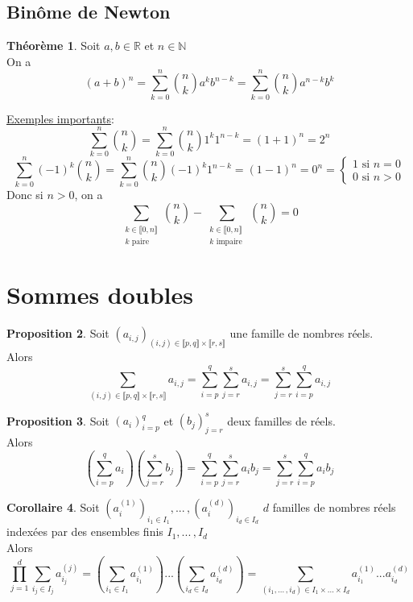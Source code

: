 \documentclass[10pt,a4paper]{article}
\theoremstyle{definition}
\newtheorem{proposition}{Proposition}[section]
\newtheorem{theorem}[proposition]{Théorème}
\newtheorem{corollaire}[proposition]{Corollaire}
\begin{document}
\subsection{Binôme de Newton}
\begin{theorem}
Soit $a, b \in \mathbb{R}$ et $n \in \mathbb{N}$ \\
On a
\[ (a + b)^n = \sum_{k = 0}^n \binom{n}{k} a^k b^{n - k} = \sum_{k = 0}^n \binom{n}{k} a^{n - k} b^k \]
\end{theorem}
\noindent \uline{Exemples importants}:
\[ \sum_{k = 0}^n \binom{n}{k} = \sum_{k = 0}^n \binom{n}{k} 1^k 1^{n - k} = (1 + 1)^n = 2^n \]
\[ \sum_{k = 0}^n (-1)^k \binom{n}{k} = \sum_{k = 0}^n \binom{n}{k} (-1)^k 1^{n - k} = (1 - 1)^n = 0^n = \begin{cases}
1 \text{ si } n = 0 \\
0 \text{ si } n > 0
\end{cases} \]
Donc si $n > 0$, on a
\[ \sum_{\substack{k \in \llbracket 0, n \rrbracket \\ k \text{ paire }}} \binom{n}{k} - \sum_{\substack{k \in \llbracket 0, n \rrbracket \\ k \text{ impaire }}} \binom{n}{k} = 0 \]

\section{Sommes doubles}
\begin{proposition}
Soit $(a_{i, j})_{(i, j) \in \llbracket p, q \rrbracket \times \llbracket r, s \rrbracket}$ une famille de nombres réels. \\
Alors
\[ \sum_{(i, j) \in \llbracket p, q \rrbracket \times \llbracket r, s \rrbracket} a_{i, j} = \sum_{i = p}^q \sum_{j = r}^s a_{i, j} = \sum_{j = r}^s \sum_{i = p}^q a_{i, j} \]
\end{proposition}
\begin{proposition}
Soit $(a_i)_{i = p}^q$ et $(b_j)_{j = r}^s$ deux familles de réels. \\
Alors
\[ \left(\sum_{i = p}^q a_i\right) \left(\sum_{j = r}^s b_j\right) = \sum_{i = p}^q \sum_{j = r}^s a_i b_j = \sum_{j = r}^s \sum_{i = p}^q a_i b_j \]
\end{proposition}
\begin{corollaire}
Soit $\left(a_i^{(1)}\right)_{i_1 \in I_1}, ...\,, \left( a_i^{(d)}\right)_{i_d \in I_d}$ $d$ familles de nombres réels indexées par des ensembles finis $I_1, ...\,, I_d$ \\
Alors
\[ \prod_{j = 1}^d \sum_{i_j \in I_j} a_{i_j}^{(j)} = \left(\sum_{i_1 \in I_1} a_{i_1}^{(1)} \right) ... \left( \sum_{i_d \in I_d} a_{i_d}^{(d)}\right) = \sum_{(i_1, ...\,, i_d) \in I_1 \times ... \times I_d} a_{i_1}^{(1)} ... a_{i_d}^{(d)}\]
\end{corollaire}
\end{document}
